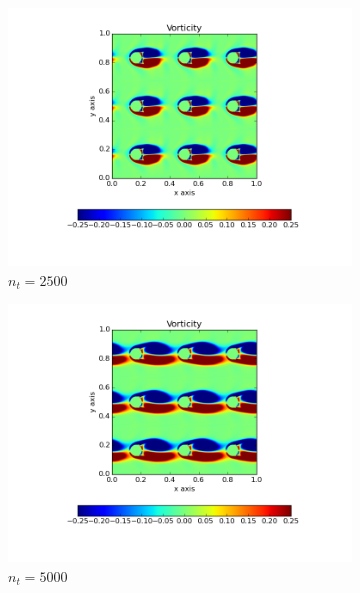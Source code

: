 \documentclass[10pt, a4paper]{article}
\begin{document}
\begin{figure}[htb!]
\centering
\begin{subfigure}{.5\textwidth}
  \centering
  \includegraphics[width=1.1\linewidth, clip=true, trim=1cm 1cm 1cm 1cm]{q5_0001}
  \caption{$n_t = 2500$}
  \label{fig:sub1}
\end{subfigure}%
\begin{subfigure}{.5\textwidth}
  \centering
  \includegraphics[width=1.1\linewidth, clip=true, trim=1cm 1cm 1cm 1cm]{q5_0002}
  \caption{$n_t = 5000$}
  \label{fig:sub2}
\end{subfigure}
\newline
\begin{subfigure}{.5\textwidth}
  \centering

\end{subfigure}
\end{figure}
\end{document}
